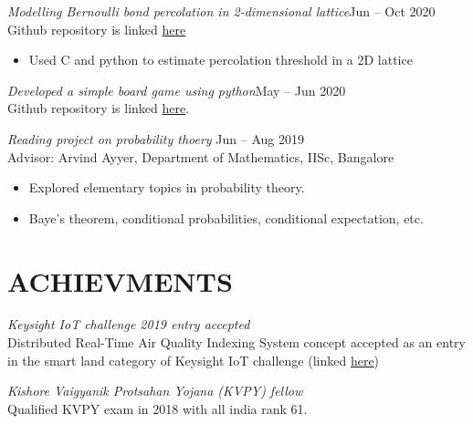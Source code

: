 \documentclass[margin, 10pt]{res} %
\begin{document}
\begin{resume}
\smallskip

{\sl Modelling Bernoulli bond percolation in 2-dimensional lattice}\hfill Jun -- Oct 2020\\
Github repository is linked
\href{https://github.com/AbhinavM2000/percolation\_}{here}
\begin{itemize}
	\item Used C and python to estimate percolation threshold in a 2D lattice
\end{itemize}

\smallskip

{\sl Developed a simple board game using python}\hfill May -- Jun 2020\\
Github repository is linked
\href{https://github.com/DhanusML/marble-and-hole-puzzle}{here}.

\smallskip

{\sl Reading project on probability thoery} \hfill Jun -- Aug 2019 \\
Advisor: Arvind Ayyer, Department of Mathematics, IISc, Bangalore
\begin{itemize} \itemsep -2pt %
	\item Explored elementary topics in probability theory.
	\item Baye's theorem, conditional probabilities,
		conditional expectation, etc.
\end{itemize}




\section{ACHIEVMENTS}

{\sl Keysight IoT challenge 2019 entry accepted}\\
Distributed Real-Time Air Quality Indexing System concept accepted
as an entry in the smart land category of Keysight IoT challenge
(linked \href{https://www.iotchallengekeysight.com/2019/entries/smart-land/41-0413-102730-draqis-distributed-real-time-air-quality-indexing-system}{here})

{\sl Kishore Vaigyanik Protsahan Yojana (KVPY) fellow}\\
Qualified KVPY exam in 2018 with all india rank 61.





\end{resume}
\end{document}
